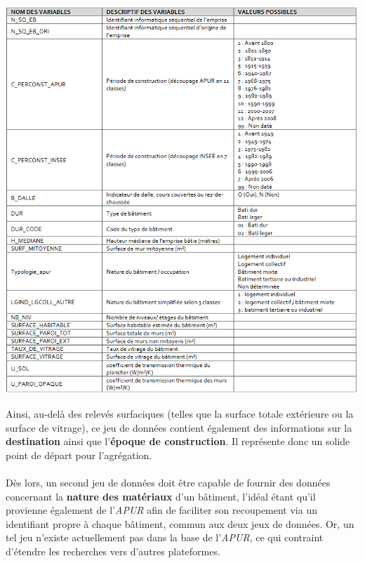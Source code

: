 \documentclass[
  11pt,
  french,
]{article}
\newcounter{customfigs}[section]
\newenvironment{customfigs}[1][] {
    \stepcounter{customfigs}
    Fig \arabic{section}. \arabic{customfigs} : }
\newcommand{\masked}{\vspace*{-\baselineskip}}
\begin{document}
\begin{tcolorbox}[title=\begin{customfigs} Des variables fournissant des informations précieuses sur l'existant \end{customfigs}]

\begin{center}\includegraphics[width=1\linewidth]{__imgs/meta_apur} \end{center}

\end{tcolorbox}

Ainsi, au-delà des relevés surfaciques (telles que la surface totale
extérieure ou la surface de vitrage), ce jeu de données contient
également des informations sur la \textbf{destination} ainsi que
l'\textbf{époque de construction}. Il représente donc un solide point de
départ pour l'agrégation.\\
~\\
Dès lors, un second jeu de données doit être capable de fournir des
données concernant la \textbf{nature des matériaux} d'un bâtiment,
l'idéal étant qu'il provienne également de l'\emph{APUR} afin de
faciliter son recoupement via un identifiant propre à chaque bâtiment,
commun aux deux jeux de données. Or, un tel jeu n'existe actuellement
pas dans la base de l'\emph{APUR}, ce qui contraint d'étendre les
recherches vers d'autres plateformes.\\
\end{document}
